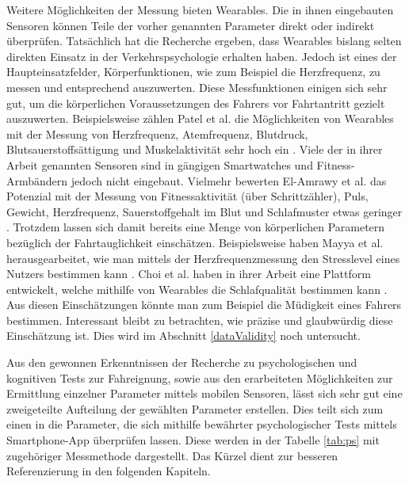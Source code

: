 Weitere Möglichkeiten der Messung bieten Wearables. Die in ihnen eingebauten Sensoren können Teile der vorher genannten Parameter direkt oder indirekt überprüfen. Tatsächlich hat die Recherche ergeben, dass Wearables bislang selten direkten Einsatz in der Verkehrspsychologie erhalten haben. Jedoch ist eines der Haupteinsatzfelder, Körperfunktionen, wie zum Beispiel die Herzfrequenz, zu messen und entsprechend auszuwerten. Diese Messfunktionen einigen sich sehr gut, um die körperlichen Voraussetzungen des Fahrers vor Fahrtantritt gezielt auszuwerten. Beispielsweise zählen Patel et al. die Möglichkeiten von Wearables mit der Messung von Herzfrequenz, Atemfrequenz, Blutdruck, Blutsauerstoffsättigung und Muskelaktivität sehr hoch ein \cite{reviewwearablesensors}. Viele der in ihrer Arbeit genannten Sensoren sind in gängigen Smartwatches und Fitness-Armbändern jedoch nicht eingebaut. Vielmehr bewerten  El-Amrawy et al. das Potenzial mit der Messung von Fitnessaktivität (über Schrittzähler), Puls, Gewicht, Herzfrequenz, Sauerstoffgehalt im Blut und Schlafmuster etwas geringer \cite{wearabletracking}. Trotzdem lassen sich damit bereits eine Menge von körperlichen Parametern bezüglich der Fahrtauglichkeit einschätzen. Beispielsweise haben Mayya et al. herausgearbeitet, wie man mittels der Herzfrequenzmessung den Stresslevel eines Nutzers bestimmen kann \cite{monitoringstressheartrate}. Choi et al. haben in ihrer Arbeit eine Plattform entwickelt, welche mithilfe von Wearables die Schlafqualität bestimmen kann \cite{platformsleepquality}. Aus diesen Einschätzungen könnte man zum Beispiel die Müdigkeit eines Fahrers bestimmen. Interessant bleibt zu betrachten, wie präzise und glaubwürdig diese Einschätzung ist. Dies wird im Abschnitt \ref{dataValidity} noch untersucht.

Aus den gewonnen Erkenntnissen der Recherche zu psychologischen und kognitiven Tests zur Fahreignung, sowie aus den erarbeiteten Möglichkeiten zur Ermittlung einzelner Parameter mittels mobilen Sensoren, lässt sich sehr gut eine zweigeteilte Aufteilung der gewählten Parameter erstellen. Dies teilt sich zum einen in die Parameter, die sich mithilfe bewährter psychologischer Tests mittels Smartphone-App überprüfen lassen. Diese werden in der Tabelle \ref{tab:ps} mit zugehöriger Messmethode dargestellt. Das Kürzel dient zur besseren Referenzierung in den folgenden Kapiteln. 

